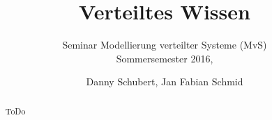 \documentclass{llncs}
\begin{document}
\title{Verteiltes Wissen}
\subtitle{\small{ Seminar Modellierung verteilter Systeme (MvS)\\ Sommersemester 2016,}}
\author{Danny Schubert, Jan Fabian Schmid\\}
\maketitle

\begin{abstract}
ToDo
\end{abstract}











\end{document}

